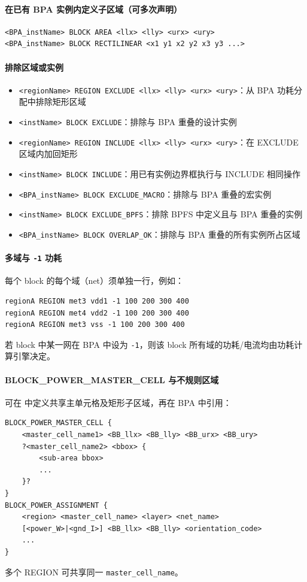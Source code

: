 \paragraph{在已有 BPA 实例内定义子区域（可多次声明）}
\begin{lstlisting}
<BPA_instName> BLOCK AREA <llx> <lly> <urx> <ury>
<BPA_instName> BLOCK RECTILINEAR <x1 y1 x2 y2 x3 y3 ...>
\end{lstlisting}

\paragraph{排除区域或实例}
\begin{itemize}
  \item \texttt{<regionName> REGION EXCLUDE <llx> <lly> <urx> <ury>}：从 BPA 功耗分配中排除矩形区域
  \item \texttt{<instName> BLOCK EXCLUDE}：排除与 BPA 重叠的设计实例
  \item \texttt{<regionName> REGION INCLUDE <llx> <lly> <urx> <ury>}：在 EXCLUDE 区域内加回矩形
  \item \texttt{<instName> BLOCK INCLUDE}：用已有实例边界框执行与 INCLUDE 相同操作
  \item \texttt{<BPA_instName> BLOCK EXCLUDE_MACRO}：排除与 BPA 重叠的宏实例
  \item \texttt{<instName> BLOCK EXCLUDE_BPFS}：排除 BPFS 中定义且与 BPA 重叠的实例
  \item \texttt{<BPA_instName> BLOCK OVERLAP_OK}：排除与 BPA 重叠的所有实例所占区域
\end{itemize}

\paragraph{多域与 \texttt{-1} 功耗}
每个 block 的每个域（net）须单独一行，例如：
\begin{lstlisting}
regionA REGION met3 vdd1 -1 100 200 300 400
regionA REGION met4 vdd2 -1 100 200 300 400
regionA REGION met3 vss -1 100 200 300 400
\end{lstlisting}
若 block 中某一网在 BPA 中设为 \texttt{-1}，则该 block 所有域的功耗/电流均由功耗计算引擎决定。

\paragraph{BLOCK\_POWER\_MASTER\_CELL 与不规则区域}
可在  中定义共享主单元格及矩形子区域，再在 BPA 中引用：
\begin{lstlisting}
BLOCK_POWER_MASTER_CELL {
    <master_cell_name1> <BB_llx> <BB_lly> <BB_urx> <BB_ury>
    ?<master_cell_name2> <bbox> {
        <sub-area bbox>
        ...
    }?
}
BLOCK_POWER_ASSIGNMENT {
    <region> <master_cell_name> <layer> <net_name>
    [<power_W>|<gnd_I>] <BB_llx> <BB_lly> <orientation_code>
    ...
}
\end{lstlisting}
多个 REGION 可共享同一 \texttt{master_cell_name}。

